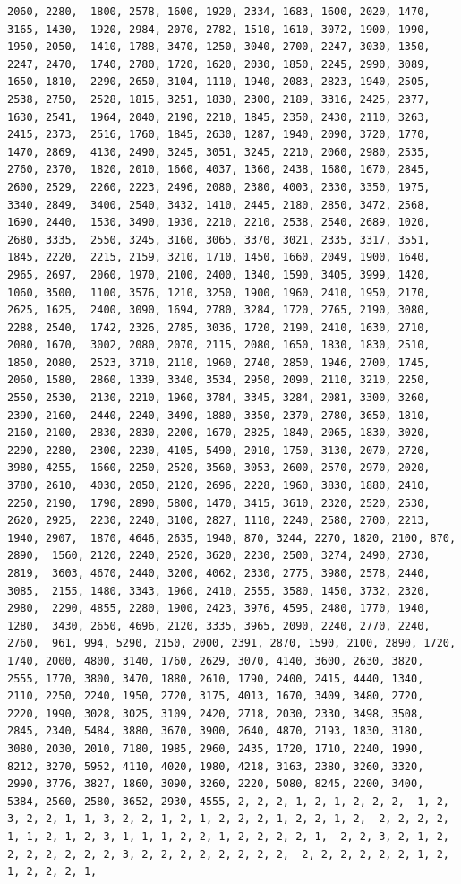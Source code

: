 \documentclass[
]{article}
\begin{document}
\begin{verbatim}
2060, 2280,  1800, 2578, 1600, 1920, 2334, 1683, 1600, 2020, 1470, 3165, 1430,  1920, 2984, 2070, 2782, 1510, 1610, 3072, 1900, 1990, 1950, 2050,  1410, 1788, 3470, 1250, 3040, 2700, 2247, 3030, 1350, 2247, 2470,  1740, 2780, 1720, 1620, 2030, 1850, 2245, 2990, 3089, 1650, 1810,  2290, 2650, 3104, 1110, 1940, 2083, 2823, 1940, 2505, 2538, 2750,  2528, 1815, 3251, 1830, 2300, 2189, 3316, 2425, 2377, 1630, 2541,  1964, 2040, 2190, 2210, 1845, 2350, 2430, 2110, 3263, 2415, 2373,  2516, 1760, 1845, 2630, 1287, 1940, 2090, 3720, 1770, 1470, 2869,  4130, 2490, 3245, 3051, 3245, 2210, 2060, 2980, 2535, 2760, 2370,  1820, 2010, 1660, 4037, 1360, 2438, 1680, 1670, 2845, 2600, 2529,  2260, 2223, 2496, 2080, 2380, 4003, 2330, 3350, 1975, 3340, 2849,  3400, 2540, 3432, 1410, 2445, 2180, 2850, 3472, 2568, 1690, 2440,  1530, 3490, 1930, 2210, 2210, 2538, 2540, 2689, 1020, 2680, 3335,  2550, 3245, 3160, 3065, 3370, 3021, 2335, 3317, 3551, 1845, 2220,  2215, 2159, 3210, 1710, 1450, 1660, 2049, 1900, 1640, 2965, 2697,  2060, 1970, 2100, 2400, 1340, 1590, 3405, 3999, 1420, 1060, 3500,  1100, 3576, 1210, 3250, 1900, 1960, 2410, 1950, 2170, 2625, 1625,  2400, 3090, 1694, 2780, 3284, 1720, 2765, 2190, 3080, 2288, 2540,  1742, 2326, 2785, 3036, 1720, 2190, 2410, 1630, 2710, 2080, 1670,  3002, 2080, 2070, 2115, 2080, 1650, 1830, 1830, 2510, 1850, 2080,  2523, 3710, 2110, 1960, 2740, 2850, 1946, 2700, 1745, 2060, 1580,  2860, 1339, 3340, 3534, 2950, 2090, 2110, 3210, 2250, 2550, 2530,  2130, 2210, 1960, 3784, 3345, 3284, 2081, 3300, 3260, 2390, 2160,  2440, 2240, 3490, 1880, 3350, 2370, 2780, 3650, 1810, 2160, 2100,  2830, 2830, 2200, 1670, 2825, 1840, 2065, 1830, 3020, 2290, 2280,  2300, 2230, 4105, 5490, 2010, 1750, 3130, 2070, 2720, 3980, 4255,  1660, 2250, 2520, 3560, 3053, 2600, 2570, 2970, 2020, 3780, 2610,  4030, 2050, 2120, 2696, 2228, 1960, 3830, 1880, 2410, 2250, 2190,  1790, 2890, 5800, 1470, 3415, 3610, 2320, 2520, 2530, 2620, 2925,  2230, 2240, 3100, 2827, 1110, 2240, 2580, 2700, 2213, 1940, 2907,  1870, 4646, 2635, 1940, 870, 3244, 2270, 1820, 2100, 870, 2890,  1560, 2120, 2240, 2520, 3620, 2230, 2500, 3274, 2490, 2730, 2819,  3603, 4670, 2440, 3200, 4062, 2330, 2775, 3980, 2578, 2440, 3085,  2155, 1480, 3343, 1960, 2410, 2555, 3580, 1450, 3732, 2320, 2980,  2290, 4855, 2280, 1900, 2423, 3976, 4595, 2480, 1770, 1940, 1280,  3430, 2650, 4696, 2120, 3335, 3965, 2090, 2240, 2770, 2240, 2760,  961, 994, 5290, 2150, 2000, 2391, 2870, 1590, 2100, 2890, 1720,  1740, 2000, 4800, 3140, 1760, 2629, 3070, 4140, 3600, 2630, 3820,  2555, 1770, 3800, 3470, 1880, 2610, 1790, 2400, 2415, 4440, 1340,  2110, 2250, 2240, 1950, 2720, 3175, 4013, 1670, 3409, 3480, 2720,  2220, 1990, 3028, 3025, 3109, 2420, 2718, 2030, 2330, 3498, 3508,  2845, 2340, 5484, 3880, 3670, 3900, 2640, 4870, 2193, 1830, 3180,  3080, 2030, 2010, 7180, 1985, 2960, 2435, 1720, 1710, 2240, 1990,  8212, 3270, 5952, 4110, 4020, 1980, 4218, 3163, 2380, 3260, 3320,  2990, 3776, 3827, 1860, 3090, 3260, 2220, 5080, 8245, 2200, 3400,  5384, 2560, 2580, 3652, 2930, 4555, 2, 2, 2, 1, 2, 1, 2, 2, 2,  1, 2, 3, 2, 2, 1, 1, 3, 2, 2, 1, 2, 1, 2, 2, 2, 1, 2, 2, 1, 2,  2, 2, 2, 2, 1, 1, 2, 1, 2, 3, 1, 1, 1, 2, 2, 1, 2, 2, 2, 2, 1,  2, 2, 3, 2, 1, 2, 2, 2, 2, 2, 2, 2, 3, 2, 2, 2, 2, 2, 2, 2, 2,  2, 2, 2, 2, 2, 2, 1, 2, 1, 2, 2, 2, 1, 
\end{verbatim}
\end{document}

